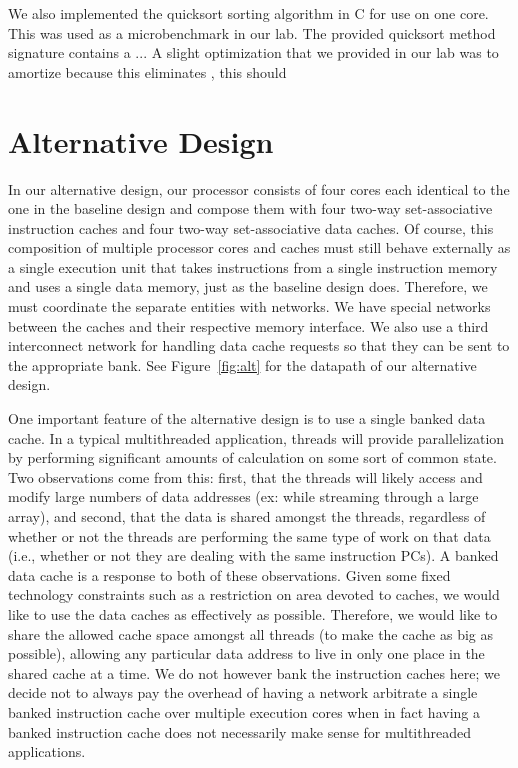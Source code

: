 \documentclass[10pt]{article}
\begin{document}
We also implemented the quicksort sorting algorithm in C for use on
one core. This was used as a microbenchmark in our lab. The provided quicksort method signature contains a ...
A slight optimization that we provided in our lab was to amortize
because this eliminates , this should 



\section{Alternative Design}

In our alternative design, our processor consists of four cores each identical to the one in the baseline design and compose them with four two-way set-associative instruction caches and four two-way set-associative data caches. Of course, this composition of multiple processor cores and caches must still behave externally as a single execution unit that takes instructions from a single instruction memory and uses a single data memory, just as the baseline design does. Therefore, we must coordinate the separate entities with networks. We have special networks between the caches and their respective memory interface. We also use a third interconnect network for handling data cache requests so that they can be sent to the appropriate bank. See Figure~\ref{fig:alt} for the datapath of our alternative design.

One important feature of the alternative design is to use a single banked data cache. In a typical multithreaded application, threads will provide parallelization by performing significant amounts of calculation on some sort of common state. Two observations come from this: first, that the threads will likely access and modify large numbers of data addresses (ex: while streaming through a large array), and second, that the data is shared amongst the threads, regardless of whether or not the threads are performing the same type of work on that data (i.e., whether or not they are dealing with the same instruction PCs). A banked data cache is a response to both of these observations. Given some fixed technology constraints such as a restriction on area devoted to caches, we would like to use the data caches as effectively as possible. Therefore, we would like to share the allowed cache space amongst all threads (to make the cache as big as possible), allowing any particular data address to live in only one place in the shared cache at a time. We do not however bank the instruction caches here; we decide not to always pay the overhead of having a network arbitrate a single banked instruction cache over multiple execution cores when in fact having a banked instruction cache does not necessarily make sense for multithreaded applications.
\end{document}
